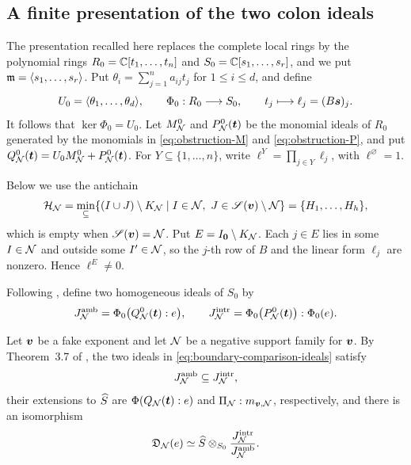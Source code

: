 \subsection{A finite presentation of the two colon ideals}
\label{subsec:finite-boundary-presentation}

The presentation recalled here replaces the complete local rings by the polynomial rings \(R_0=\mathbb C[t_1,\ldots,t_n]\) and \(S_0=\mathbb C[s_1,\ldots,s_r]\), and we put \(\mathfrak m=\langle s_1,\ldots,s_r\rangle\).
Put \(\theta_i=\sum_{j=1}^n a_{ij}t_j\) for \(1\leq i\leq d\), and define
\[
	U_0=\langle\theta_1,\ldots,\theta_d\rangle,
	\qquad
	\Phi_0:R_0\longrightarrow S_0,
	\qquad
	t_j\longmapsto\ell_j=(B\boldsymbol{s})_j.
\]
It follows that \(\ker\Phi_0=U_0\).
Let \(M_{\mathcal N}^0\) and \(P_{\mathcal N}^0(\boldsymbol{t})\) be the monomial ideals of \(R_0\) generated by the monomials in \eqref{eq:obstruction-M} and \eqref{eq:obstruction-P}, and put \(Q_{\mathcal N}^0(\boldsymbol{t})=U_0M_{\mathcal N}^0+P_{\mathcal N}^0(\boldsymbol{t})\).
For \(Y\subseteq\{1,\ldots,n\}\), write \(\ell^Y=\prod_{j\in Y}\ell_j\), with \(\ell^{\varnothing}=1\).

Below we use the antichain
\begin{equation}
	\mathcal H_{\mathcal N}
	=
	\min_{\subseteq}
	\{(I\cup J)\setminus K_{\mathcal N}
	\mid I\in\mathcal N,\
	J\in\mathscr S(\boldsymbol{v})\setminus\mathcal N\}
	=\{H_1,\ldots,H_h\},
	\label{eq:boundary-H-antichain}
\end{equation}
which is empty when \(\mathscr S(\boldsymbol{v})=\mathcal N\).
Put \(E=I_{\boldsymbol{0}}\setminus K_{\mathcal N}\).
Each \(j\in E\) lies in some \(I\in\mathcal N\) and outside some \(I'\in\mathcal N\), so the \(j\)-th row of \(B\) and the linear form \(\ell_j\) are nonzero.
Hence \(\ell^E\ne0\).

Following \cite{Nak26}, define two homogeneous ideals of \(S_0\) by
\begin{equation}
	J_{\mathcal N}^{\mathrm{amb}}=\Phi_0\bigl(Q_{\mathcal N}^0(\boldsymbol{t}):e\bigr), \qquad J_{\mathcal N}^{\mathrm{intr}}=\Phi_0\bigl(P_{\mathcal N}^0(\boldsymbol{t})\bigr):\Phi_0(e).
	\label{eq:boundary-comparison-ideals}
\end{equation}

\begin{fact}
	\label{fact:finite-presentation}
	Let \(\boldsymbol{v}\) be a fake exponent and let \(\mathcal N\) be a negative support family for \(\boldsymbol{v}\).
	By Theorem~3.7 of \cite{Nak26}, the two ideals in \eqref{eq:boundary-comparison-ideals} satisfy
	\begin{equation}
		J_{\mathcal N}^{\mathrm{amb}}
		\subseteq
		J_{\mathcal N}^{\mathrm{intr}},
		\label{eq:boundary-annihilator-colon}
	\end{equation}
	their extensions to \(\widehat S\) are \(\Phi(Q_{\mathcal N}(\boldsymbol{t}):e)\) and \(\Pi_{\mathcal N}:m_{\boldsymbol{v},\mathcal N}\), respectively, and there is an isomorphism
	\begin{equation}
		\mathfrak D_{\mathcal N}(e)
		\simeq
		\widehat S\otimes_{S_0}
		\frac{J_{\mathcal N}^{\mathrm{intr}}}{J_{\mathcal N}^{\mathrm{amb}}}.
		\label{eq:boundary-classification-isomorphism}
	\end{equation}
\end{fact}

